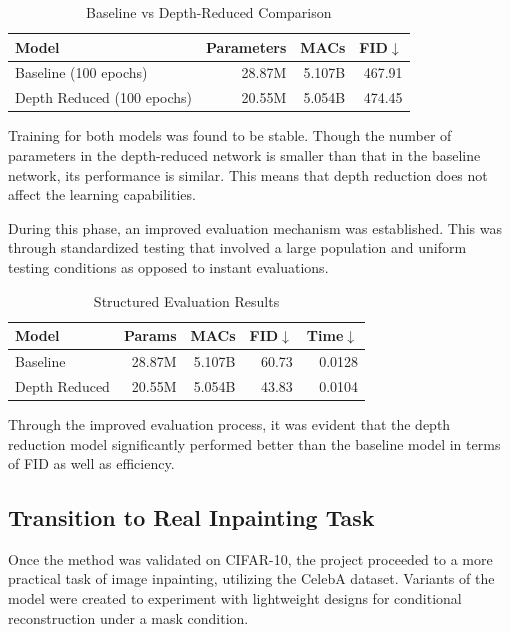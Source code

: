 \documentclass[journal]{IEEEtran}
\begin{document}
\begin{table}[t]
\caption{Baseline vs Depth-Reduced Comparison}
\label{tab:stability}
\centering
\footnotesize
\setlength{\tabcolsep}{3pt}
\begin{tabular}{lrrr}
\toprule
Model & Parameters & MACs & FID$\downarrow$ \\
\midrule
Baseline (100 epochs) & 28.87M & 5.107B & 467.91 \\
Depth Reduced (100 epochs) & 20.55M & 5.054B & 474.45 \\
\bottomrule
\end{tabular}
\end{table}

Training for both models was found to be stable. Though the number of parameters in the depth-reduced network is smaller than that in the baseline network, its performance is similar. This means that depth reduction does not affect the learning capabilities.

During this phase, an improved evaluation mechanism was established. This was through standardized testing that involved a large population and uniform testing conditions as opposed to instant evaluations.

\begin{table}[t]
\caption{Structured Evaluation Results}
\label{tab:structured}
\centering
\footnotesize
\setlength{\tabcolsep}{2.6pt}
\begin{tabular}{lrrrr}
\toprule
Model & Params & MACs & FID$\downarrow$ & Time$\downarrow$ \\
\midrule
Baseline & 28.87M & 5.107B & 60.73 & 0.0128 \\
Depth Reduced & 20.55M & 5.054B & 43.83 & 0.0104 \\
\bottomrule
\end{tabular}
\end{table}

Through the improved evaluation process, it was evident that the depth reduction model significantly performed better than the baseline model in terms of FID as well as efficiency.

\subsection{Transition to Real Inpainting Task}
Once the method was validated on CIFAR-10, the project proceeded to a more practical task of image inpainting, utilizing the CelebA dataset. Variants of the model were created to experiment with lightweight designs for conditional reconstruction under a mask condition.
\end{document}
